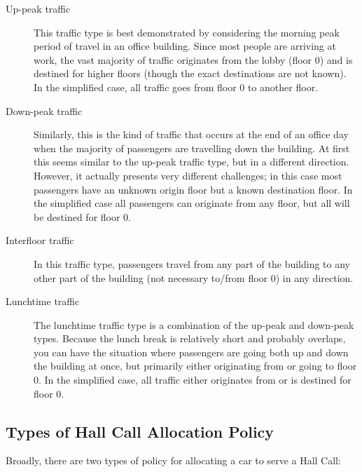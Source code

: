 \documentclass{UoYCSproject}
\begin{document}
\begin{description}
	\item[Up-peak traffic] This traffic type is best demonstrated by considering the morning peak period of travel in an office building.  Since most people are arriving at work, the vast majority of traffic originates from the lobby (floor 0) and is destined for higher floors (though the exact destinations are not known).  In the simplified case, all traffic goes from floor 0 to another floor.  \citep{Bao1994, Brand2004, Smith2002, Pepyne1997}
	\item[Down-peak traffic] Similarly, this is the kind of traffic that occurs at the end of an office day when the majority of passengers are travelling down the building.  At first this seems similar to the up-peak traffic type, but in a different direction.  However, it actually presents very different challenges; in this case most passengers have an unknown origin floor but a known destination floor.  In the simplified case all passengers can originate from any floor, but all will be destined for floor 0.  \citep{Bao1994, Brand2004, Smith2002, Pepyne1997}
	\item[Interfloor traffic] In this traffic type, passengers travel from any part of the building to any other part of the building (not necessary to/from floor 0) in any direction.  \citep{Pepyne1997, Collins1993Patent}
	\item[Lunchtime traffic] The lunchtime traffic type is a combination of the up-peak and down-peak types.  Because the lunch break is relatively short and probably overlaps, you can have the situation where passengers are going both up and down the building at once, but primarily either originating from or going to floor 0.  In the simplified case, all traffic either originates from or is destined for floor 0.  \citep{Bao1994, Brand2004, Smith2002, Pepyne1997}
\end{description}

\subsection{Types of Hall Call Allocation Policy}

Broadly, there are two types of policy for allocating a car to serve a Hall Call:  \citep{Bao1994, Rong2003, Nikovski2003}
\end{document}
